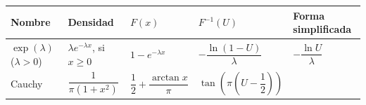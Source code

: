 \documentclass[
]{book}
\theoremstyle{break}
\theoremstyle{definition}
\theoremstyle{definition}
\theoremstyle{definition}
\theoremstyle{remark}
\begin{document}
\begin{longtable}[]{@{}lllll@{}}
\toprule
\begin{minipage}[b]{0.17\columnwidth}\raggedright
Nombre\strut
\end{minipage} & \begin{minipage}[b]{0.17\columnwidth}\raggedright
Densidad\strut
\end{minipage} & \begin{minipage}[b]{0.17\columnwidth}\raggedright
\(F(x)\)\strut
\end{minipage} & \begin{minipage}[b]{0.17\columnwidth}\raggedright
\(F^{-1}\left( U\right)\)\strut
\end{minipage} & \begin{minipage}[b]{0.17\columnwidth}\raggedright
Forma simplificada\strut
\end{minipage}\tabularnewline
\midrule
\endhead
\begin{minipage}[t]{0.17\columnwidth}\raggedright
\(\exp\left( \lambda\right)\) (\(\lambda>0\))\strut
\end{minipage} & \begin{minipage}[t]{0.17\columnwidth}\raggedright
\(\lambda e^{-\lambda x}\), si \(x\geq0\)\strut
\end{minipage} & \begin{minipage}[t]{0.17\columnwidth}\raggedright
\(1-e^{-\lambda x}\)\strut
\end{minipage} & \begin{minipage}[t]{0.17\columnwidth}\raggedright
\(-\dfrac{\ln\left( 1-U\right) }\lambda\)\strut
\end{minipage} & \begin{minipage}[t]{0.17\columnwidth}\raggedright
\(-\dfrac{\ln U}\lambda\)\strut
\end{minipage}\tabularnewline
\begin{minipage}[t]{0.17\columnwidth}\raggedright
Cauchy\strut
\end{minipage} & \begin{minipage}[t]{0.17\columnwidth}\raggedright
\(\dfrac1{\pi\left( 1+x^{2}\right) }\)\strut
\end{minipage} & \begin{minipage}[t]{0.17\columnwidth}\raggedright
\(\dfrac12+\dfrac{\arctan x}\pi\)\strut
\end{minipage} & \begin{minipage}[t]{0.17\columnwidth}\raggedright
\(\tan\left( \pi\left( U-\dfrac12\right) \right)\)\strut
\end{minipage} & \begin{minipage}[t]{0.17\columnwidth}\raggedright

\end{minipage}
\end{longtable}
\end{document}

